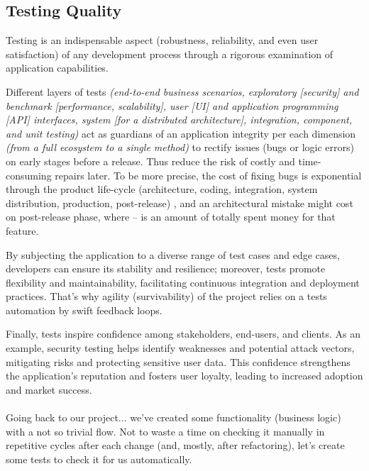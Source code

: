 
\subsection{Testing Quality}
 \label{quality}

Testing is an indispensable aspect (robustness, reliability, and even user satisfaction) of any development process 
through a rigorous examination of application capabilities.

Different layers of tests \emph{(end-to-end business scenarios, exploratory [security] and benchmark [performance, scalability], 
user [UI] and application programming [API] interfaces, system [for a distributed architecture], integration, component,
and unit testing)} act as guardians of an application integrity per each dimension \emph{(from a full ecosystem to a 
single method)} to rectify issues (bugs or logic errors) on early stages before a release. Thus reduce the risk of 
costly and time-consuming repairs later. To be more precise, the cost of fixing bugs is exponential through the
product life-cycle (architecture, coding, integration, system distribution, production, post-release) 
\cite{Sanket19} \cite{Boeh88}, and an architectural mistake might cost  on post-release phase, where 
 -- is an amount of totally spent money for that feature.

By subjecting the application to a diverse range of test cases and edge cases, developers can ensure its stability and 
resilience; moreover, tests promote flexibility and maintainability, facilitating continuous integration and deployment 
practices. That's why agility (survivability) of the project relies on a tests automation by swift feedback loops.

Finally, tests inspire confidence among stakeholders, end-users, and clients. As an example, security testing helps 
identify weaknesses and potential attack vectors, mitigating risks and protecting sensitive user data. This confidence 
strengthens the application's reputation and fosters user loyalty, leading to increased adoption and market success.\\
\\

\noindent Going back to our project... we've created some functionality (business logic) with a not so trivial flow. 
Not to waste a time on checking it manually in repetitive cycles after each change (and, mostly, after 
refactoring), let's create some tests to check it for us automatically.


